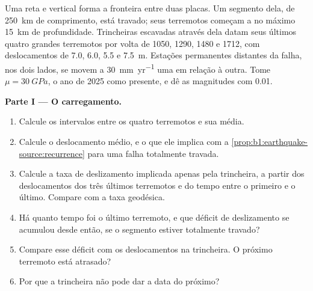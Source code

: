 \begin{problem}
\label{pb:b1:earthquake-source:1}
Uma  reta e vertical forma a fronteira entre duas placas. Um segmento dela, de \qty{250}{km} de comprimento, está travado; seus terremotos começam a no máximo \qty{15}{km} de profundidade. Trincheiras escavadas através dela datam seus últimos quatro grandes terremotos por volta de 1050, 1290, 1480 e 1712, com deslocamentos de \num{7.0}, \num{6.0}, \num{5.5} e \qty{7.5}{m}. Estações permanentes distantes da falha, nos dois lados, se movem a \qty{30}{mm.yr^{-1}} uma em relação à outra. Tome $\mu =
\qty{30}{GPa}$, o ano de 2025 como presente, e dê as magnitudes com 0.01.

\medskip
\noindent\textbf{Parte I --- O carregamento.}
\begin{enumerate}
  \item Calcule os intervalos entre os quatro terremotos e sua média.
  \item Calcule o deslocamento médio, e o  que ele implica com a \cref{prop:b1:earthquake-source:recurrence} para uma falha totalmente travada.
  \item Calcule a taxa de deslizamento implicada apenas pela trincheira, a partir dos deslocamentos dos três últimos terremotos e do tempo entre o primeiro e o último. Compare com a taxa geodésica.
  \item Há quanto tempo foi o último terremoto, e que déficit de deslizamento se acumulou desde então, se o segmento estiver totalmente travado?
  \item Compare esse déficit com os deslocamentos na trincheira. O próximo terremoto está atrasado?
  \item Por que a trincheira não pode dar a data do próximo?
\end{enumerate}


\end{problem}
